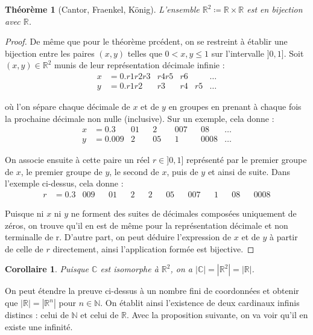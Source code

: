 \documentclass{article}
\theoremstyle{definition}
\theoremstyle{plain}
\newtheorem{theorem}[subsubsection]{Théorème}
\theoremstyle{plain}
\newtheorem{corollary}[subsubsection]{Corollaire}
\theoremstyle{plain}
\theoremstyle{plain}
\theoremstyle{plain}
\begin{document}
\begin{theorem}[Cantor, Fraenkel, König]
	L'ensemble \( \mathbb{R}^{2} \coloneqq \mathbb{R} \times \mathbb{R}\) est en bijection avec \( \mathbb{R} \). \cite{aigner2018proofs} 
\end{theorem}
\begin{proof}
	De même que pour le théorème prcédent, on se restreint à établir une bijection entre les paires \( (x,y) \) telles que \( 0 < x,y \le 1 \) sur l'intervalle \( ]0,1] \).
	Soit \( (x,y) \in \mathbb{R}^{2} \) munis de leur représentation décimale infinie :
	\begin{align*}
		x &= 0.r1r2r3 & r4r5 & r6 & &\ldots\\
		y &= 0.r1r2  & r3 & r4 & r5 &\ldots
	\end{align*}

	où l'on sépare chaque décimale de \( x \) et de \( y \) en groupes en prenant à chaque fois la prochaine décimale non nulle (inclusive). Sur un exemple, cela donne :
	\begin{align*}
		x &= 0.3 & 01 && 2 && 007 && 08 & \ldots\\
		y &= 0.009 & 2 && 05 && 1 && 0008 & \ldots
	\end{align*}

	On associe ensuite à cette paire un réel \( r \in ]0,1] \) représenté par le premier groupe de \( x \), le premier groupe de \( y \), le second de \( x \), puis de \( y \) et ainsi de suite.
	Dans l'exemple ci-dessus, cela donne :
	\begin{align*}
		r &= 0.3 & 009 && 01 && 2 && 2 && 05 && 007 && 1 && 08 && 0008
	\end{align*}

	Puisque ni \( x \) ni \( y \) ne forment des suites de décimales composées uniquement de zéros, on trouve qu'il en est de même pour la représentation décimale et non terminalle de r. 
	D'autre part, on peut déduire l'expression de \( x \) et de \( y \) à partir de celle de \( r \) directement, ainsi l'application formée est bijective.
\end{proof}
\begin{corollary}
	Puisque \( \mathbb{C} \) est isomorphe à \( \mathbb{R}^{2} \), on a \( |\mathbb{C}| = |\mathbb{R}^{2}| = |\mathbb{R}| \).
\end{corollary}

\par On peut étendre la preuve ci-dessus à un nombre fini de coordonnées et obtenir que \( |\mathbb{R}| = |\mathbb{R}^{n}| \) pour \( n \in \mathbb{N} \). \cite{dumoncel2002philosophie}
On établit ainsi l'existence de deux cardinaux infinis distincs : celui de \( \mathbb{N} \) et celui de \( \mathbb{R} \). Avec la proposition suivante, on va voir qu'il en existe une infinité.
\end{document}
